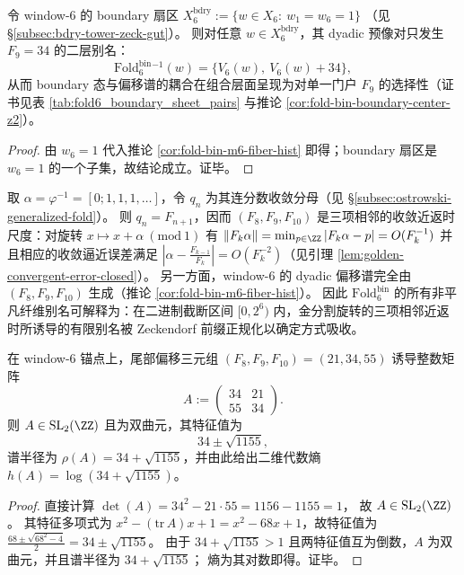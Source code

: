 \begin{corollary}\label{cor:terminal-foldbin6-boundary-pure-f9-alias}
令 window-\(6\) 的 boundary 扇区
\(
X^{\mathrm{bdry}}_6:=\{w\in X_6:\ w_1=w_6=1\}
\)
（见 \S\ref{subsec:bdry-tower-zeck-gut}）。
则对任意 \(w\in X^{\mathrm{bdry}}_6\)，其 dyadic 预像对只发生 \(F_9=34\) 的二层别名：
\[
\mathrm{Fold}^{\mathrm{bin}}_6{}^{-1}(w)=\{V_6(w),\ V_6(w)+34\},
\]
从而 boundary 态与偏移谱的耦合在组合层面呈现为对单一门户 \(F_9\) 的选择性（证书见表 \ref{tab:fold6_boundary_sheet_pairs} 与推论 \ref{cor:fold-bin-boundary-center-z2}）。
\end{corollary}
\begin{proof}
由 \(w_6=1\) 代入推论 \ref{cor:fold-bin-m6-fiber-hist} 即得；boundary 扇区是 \(w_6=1\) 的一个子集，故结论成立。证毕。
\end{proof}

\begin{corollary}\label{cor:terminal-foldbin6-offsets-return-times}
取 \(\alpha=\varphi^{-1}=[0;1,1,1,\dots]\)，令 \(q_n\) 为其连分数收敛分母（见 \S\ref{subsec:ostrowski-generalized-fold}）。
则 \(q_n=F_{n+1}\)，因而 \((F_8,F_9,F_{10})\) 是三项相邻的收敛近返时尺度：对旋转 \(x\mapsto x+\alpha\ (\mathrm{mod}\ 1)\) 有
\(
\|F_k\alpha\|=\min_{p\in\ZZ}|F_k\alpha-p|
=O(F_k^{-1})
\)
并且相应的收敛逼近误差满足 \(\left|\alpha-\frac{F_{k-1}}{F_k}\right|=O(F_k^{-2})\)（见引理 \ref{lem:golden-convergent-error-closed}）。
另一方面，window-\(6\) 的 dyadic 偏移谱完全由 \((F_8,F_9,F_{10})\) 生成（推论 \ref{cor:fold-bin-m6-fiber-hist}）。
因此 \(\mathrm{Fold}^{\mathrm{bin}}_6\) 的所有非平凡纤维别名可解释为：在二进制截断区间 \([0,2^6)\) 内，金分割旋转的三项相邻近返时所诱导的有限别名被 Zeckendorf 前缀正规化以确定方式吸收。
\end{corollary}

\begin{proposition}\label{prop:terminal-window6-sl2z-hyperbolic-from-tail-triple}
在 window-\(6\) 锚点上，尾部偏移三元组 \((F_8,F_9,F_{10})=(21,34,55)\) 诱导整数矩阵
\[
A:=\begin{pmatrix}34&21\\55&34\end{pmatrix}.
\]
则 \(A\in \mathrm{SL}_2(\ZZ)\) 且为双曲元，其特征值为
\[
34\pm \sqrt{1155},
\]
谱半径为 \(\rho(A)=34+\sqrt{1155}\)，并由此给出二维代数熵
\(
h(A)=\log(34+\sqrt{1155})
\)。
\end{proposition}
\begin{proof}
直接计算
\(
\det(A)=34^2-21\cdot 55=1156-1155=1
\)，
故 \(A\in \mathrm{SL}_2(\ZZ)\)。
其特征多项式为 \(x^2-(\mathrm{tr}\,A)x+1=x^2-68x+1\)，故特征值为
\(
\frac{68\pm\sqrt{68^2-4}}{2}=34\pm \sqrt{1155}
\)。
由于 \(34+\sqrt{1155}>1\) 且两特征值互为倒数，\(A\) 为双曲元，并且谱半径为 \(34+\sqrt{1155}\)；
熵为其对数即得。证毕。
\end{proof}


